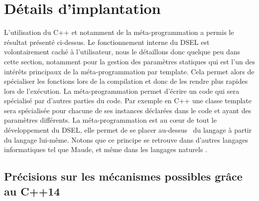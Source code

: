 \section{Détails d'implantation}

L'utilisation du \textsf{C++} et notamment de la méta-programmation a permis le résultat présenté ci-dessus. Le fonctionnement interne du DSEL est volontairement caché à l'utilisateur, nous le détaillons donc quelque peu dans cette section, notamment pour la gestion des paramètres statiques qui est l'un des intérêts principaux de la méta-programmation par template. Cela permet alors de spécialiser les fonctions lors de la compilation et donc de les rendre plus rapides lors de l'exécution. La méta-programmation permet d'écrire un code qui sera spécialisé par d'autres parties du code. Par exemple en \textsf{C++} une classe template sera spécialisée pour chacune de ses instances déclarées dans le code et ayant des paramètres différents. La méta-programmation est au cœur de tout le développement du DSEL, elle permet de se placer \og au-dessus \fg~du langage à partir du langage lui-même. Notons que ce principe se retrouve dans d'autres langages informatiques tel que \textsf{Maude}, et même dans les langages naturels \cite{Web6}.

\subsection{Précisions sur les mécanismes possibles grâce au \textsf{C++14}}

